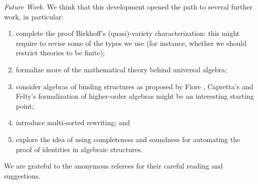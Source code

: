 \textit{Future Work.} We think that this development opened the path
to several further work, in particular:
\begin{enumerate}
\item complete the proof Birkhoff's (quasi)-variety characterization:
  this might require to revise some of the types we use (for instance,
  whether we should restrict theories to be finite);
\item formalize more of the mathematical theory behind universal algebra;
\item consider algebras of binding structures as proposed by Fiore
\cite{fiore-2010}, Capretta's and Felty's formalization \cite{capretta/felty:2009}
of higher-order algebras might be an interesting starting point;
\item introduce multi-sorted rewriting; and
\item explore the idea of using completeness and soundness for
  automating the proof of identities in algebraic structures. %
\end{enumerate}

  We are grateful to the anonymous referees for their careful reading
  and suggestions.
